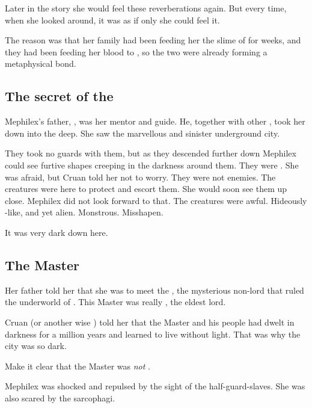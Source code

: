 Later in the story she would feel these reverberations again. 
But every time, when she looked around, it was as if only she could feel it. 

The reason was that her family had been feeding her the slime of \Ubloth for weeks, and they had been feeding her blood to \Ubloth, so the two were already forming a metaphysical bond. 









\subsection{The secret of the \ophidians}
Mephilex's father, , was her mentor and guide.
He, together with other \rethyaxes, took her down into the deep. 
She saw the marvellous and sinister underground city. 

They took no guards with them, but as they descended further down Mephilex could see furtive shapes creeping in the darkness around them.
They were . 
She was afraid, but Cruan told her not to worry.
They were not enemies.
The creatures were here to protect and escort them.
She would soon see them up close.
Mephilex did not look forward to that.
The creatures were awful.
Hideously \scatha-like, and yet alien.
Monstrous.
Misshapen. 

It was very dark down here. 









\subsection{The Master}
Her father told her that she was to meet the , the mysterious non-\scathaese lord that ruled the underworld of \Yormis.
This Master was really , the eldest \ophidian lord. 

Cruan (or another wise \scatha) told her that the Master and his people had dwelt in darkness for a million years and learned to live without light. 
That was why the city was so dark.

Make it clear that the Master was \emph{not} \Ubloth. 

Mephilex was shocked and repulsed by the sight of the half-\scathaese guard-slaves.
She was also scared by the \ophidian sarcophagi.

